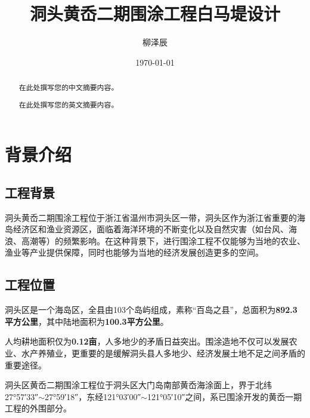 \documentclass[UTF8, a4paper, 12pt]{ctexart} %
\title{洞头黄岙二期围涂工程白马堤设计}
\author{柳泽辰}
\date{\today}
\begin{document}
\maketitle
\newpage
\section*{\centering}
\begin{abstract}
  在此处撰写您的中文摘要内容。
\end{abstract}
\newpage

\section*{\centering }
\begin{abstract}
  在此处撰写您的英文摘要内容。
\end{abstract}
\newpage
% 
\tableofcontents
\newpage

\section{背景介绍}

\subsection{工程背景}
洞头黄岙二期围涂工程位于浙江省温州市洞头区一带，洞头区作为浙江省重要的海岛经济区和渔业资源区，面临着海洋环境的不断变化以及自然灾害（如台风、海浪、高潮等）的频繁影响。在这种背景下，进行围涂工程不仅能够为当地的农业、渔业等产业提供保障，同时也能够为当地的经济发展创造更多的空间。
\subsection{工程位置}
洞头区是一个海岛区，全县由103个岛屿组成，素称“百岛之县”，总面积为\textbf{892.3平方公里}，其中陆地面积为\textbf{100.3平方公里}。

人均耕地面积仅为\textbf{0.12亩}，人多地少的矛盾日益突出。围涂造地不仅可以发展农业、水产养殖业，更重要的是缓解洞头县人多地少、经济发展土地不足之间矛盾的重要途径。

洞头区黄岙二期围涂工程位于洞头区大门岛南部黄岙海涂面上，界于北纬27°57′33″$\sim$27°59′18″，东经121°03′00″$\sim$121°05′10″之间，系已围涂开发的黄岙一期工程的外围部分。
\end{document}
